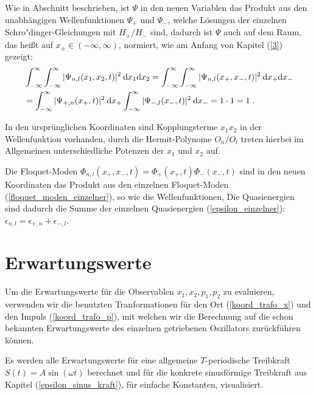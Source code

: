   Wie in Abschnitt  beschrieben, ist $\Psi$ in den neuen Variablen das Produkt aus den unabhängigen Wellenfunktionen $\Psi_+$ und $\Psi_-$, welche Lösungen der einzelnen Schro"dinger-Gleichungen mit $H_+/H_-$ sind, dadurch ist $\Psi$ auch auf dem Raum, das heißt auf $x_\pm \in (-\infty,\infty)$, normiert, wie am Anfang von Kapitel (\ref{3}) gezeigt:
  \begin{align}
    &\int_{-\infty}^{\infty}\int_{-\infty}^{\infty} |\Psi_{n,l}(x_1,x_2,t)|^2 \: \text dx_1\text dx_2
    =\int_{-\infty}^{\infty}\int_{-\infty}^{\infty} |\Psi_{n,l}(x_+,x_-,t)|^2 \: \text dx_+\text dx_- \notag\\
    &=\int_{-\infty}^{\infty} |\Psi_{+,n}(x_+,t)|^2 \: \text dx_+ \int_{-\infty}^{\infty} |\Psi_{-,l}(x_-,t)|^2 \: \text dx_-
    = 1 \cdot 1 = 1 \; .
    \label{norm_gekoppelt}
  \end{align}

  In den ursprünglichen Koordinaten sind Kopplungsterme $x_1x_2$ in der Wellenfunktion vorhanden, durch die Hermit-Polynome $O_n/O_l$ treten hierbei im Allgemeinen unterschiedliche Potenzen der $x_1$ und $x_2$ auf.

  Die Floquet-Moden $\Phi_{n,l}(x_+,x_-,t)=\Phi_+(x_+,t)\Phi_-(x_-,t)$ sind in den neuen Koordinaten das Produkt aus den einzelnen Floquet-Moden (\ref{floquet_moden_einzelner}), so wie die Wellenfunktionen,
  Die Quasienergien sind dadurch die Summe der einzelnen Quasienergien (\ref{epsilon_einzelner}): $\epsilon_{n,l}=\epsilon_{+,n}+\epsilon_{-,l}$.


\section{Erwartungswerte}
  \label{erwartungswerte_gekoppelt}
  Um die Erwartungswerte für die Observablen $x_1,x_2,p_1,p_2$ zu evaluieren, verwenden wir die benutzten Tranformationen für den Ort (\ref{koord_trafo_x}) und den Impuls (\ref{koord_trafo_p}), mit welchen wir die Berechnung auf die schon bekannten Erwartungswerte des einzelnen getriebenen Oszillators zurückführen können.

  Es werden alle Erwartungswerte für eine allgemeine $T$-periodische Treibkraft $S(t)=A\sin(\omega t)$ berechnet und für die konkrete sinusförmige Treibkraft aus Kapitel (\ref{epsilon_sinus_kraft}), für einfache Konstanten, visualisiert.

